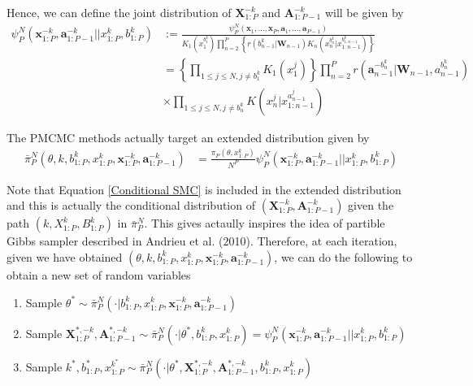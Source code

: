 \documentclass[12pt,a4paper]{article}
\begin{document}
Hence, we can define the joint distribution of $\textbf{X}_{1:P}^{-k}$ and $\textbf{A}_{1:P-1}^{-k}$ will be given by 
\begin{equation}
    \label{Conditional SMC} 
    \begin{split}
        \psi_P^{N}\left(\textbf{x}_{1:P}^{-k},\textbf{a}_{1:P-1}^{-k}||x_{1:P}^k,b_{1:P}^k\right) &:= \frac{\psi_P^N(\textbf{x}_1,...,\textbf{x}_P,\textbf{a}_1,...,\textbf{a}_{P-1})}{K_1\left(x_1^{b_1^k}\right)\prod_{n=2}^P \left\{r\left(b_{n-1}^k|\textbf{W}_{n-1}\right)K_n\left(x_n^{b_n^k}|x_{1:n-1}^{b_{1:n-1}^k}\right)\right\}}\\
        & = \left\{\prod_{1\leq j \leq N,j \neq b_1^k} K_1\left(x_1^j\right)\right\}\prod_{n=2}^P r\left(\textbf{a}_{n-1}^{-b_{n}^k}|\textbf{W}_{n-1},a_{n-1}^{b_n^k}\right) \\
        & \times \prod_{1 \leq j \leq N, j \neq b_n^k} K\left(x_n^j|x_{1:n-1}^{a_{n-1}^j}\right)
    \end{split}
\end{equation} 

The PMCMC methods actually target an extended distribution given by 
\begin{equation}
    \label{PMCMC Target}
    \begin{split}
        \bar{\pi}_P^N \left(\theta,k,b_{1:P}^k,x_{1:P}^k,\textbf{x}_{1:P}^{-k},\textbf{a}_{1:P-1}^{-k}\right) &= \frac{\pi_{P}(\theta,x_{1:P}^k)}{N^P} \psi_P^{N}\left(\textbf{x}_{1:P}^{-k},\textbf{a}_{1:P-1}^{-k}||x_{1:P}^k,b_{1:P}^k\right)
    \end{split}
\end{equation}

Note that Equation \eqref{Conditional SMC} is included in the extended distribution and this is actually the conditional distribution of $\left(\textbf{X}_{1:P}^{-k},\textbf{A}_{1:P-1}^{-k}\right)$ given the path $\left(k,X_{1:P}^k,B_{1:P}^k\right)$ in $\bar{\pi}_P^N$. This gives actaully inspires the idea of partible Gibbs sampler described in Andrieu et al. (2010). Therefore, at each iteration, given we have obtained $\left(\theta,k,b_{1:P}^k,x_{1:P}^k,\textbf{x}_{1:P}^{-k},\textbf{a}_{1:P-1}^{-k}\right)$, we can do the following to obtain a new set of random variables

\begin{enumerate}
    \item Sample $\theta^{*} \sim \bar{\pi}_P^N\left(\cdot|b_{1:P}^k,x_{1:P}^k,\textbf{x}_{1:P}^{-k},\textbf{a}_{1:P-1}^{-k}\right)$ 
    \item Sample $\textbf{X}_{1:P}^{*,-k},\textbf{A}_{1:P-1}^{*,-k} \sim \bar{\pi}_P^N\left(\cdot|\theta^{*},b_{1:P}^k,x_{1:P}^k\right)=\psi_P^{N}\left(\textbf{x}_{1:P}^{-k},\textbf{a}_{1:P-1}^{-k}||x_{1:P}^k,b_{1:P}^k\right)$
    \item Sample $k^{*},b_{1:P}^{*},x_{1:P}^{k^{*}} \sim \bar{\pi}_P^N\left(\cdot|\theta^{*},\textbf{X}_{1:P}^{*,-k},\textbf{A}_{1:P-1}^{*,-k},b_{1:P}^k,x_{1:P}^k\right)$
\end{enumerate}
\end{document}
